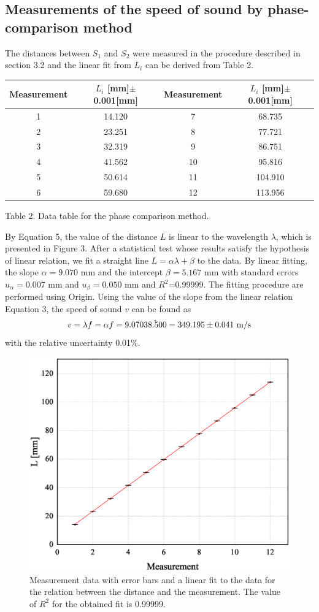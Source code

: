 \documentclass[a4paper]{report}
\begin{document}
	\subsection{Measurements of the speed of sound by phase-comparison method}
	The distances between $S_1$ and $S_2$ were measured in the procedure described in section 3.2 and the linear fit from $L_i$ can be derived from Table 2.
	\begin{tabular}{|c|c||c|c|}
		\hline
		Measurement&$L_i$ [mm]$\pm$0.001[mm]&Measurement&$L_i$ [mm]$\pm$0.001[mm]\\
		\hline
		1&14.120&7&68.735\\
		\hline
		2&23.251&8&77.721\\
		\hline
		3&32.319&9&86.751\\
		\hline
		4&41.562&10&95.816\\
		\hline
		5&50.614&11&104.910\\
		\hline
		6&59.680&12&113.956\\
		\hline
	\end{tabular}
	\begin{center}
		Table 2. Data table for the phase comparison method.
	\end{center}
	By Equation 5, the value of the distance $L$ is linear to the wavelength $\lambda$, which is presented in Figure 3. After a statistical test whose results satisfy the hypothesis of linear relation, we fit a straight line $L=\alpha \lambda+\beta$ to the data. By linear fitting, the slope $\alpha=9.070$ mm and the intercept $\beta=5.167$ mm with standard errors $u_\alpha=0.007$ mm and $u_\beta=0.050$ mm and $R^2$=0.99999. The fitting procedure are performed using Origin.
	Using the value of the slope from the linear relation Equation 3, the speed of sound $v$ can be found as
	\begin{equation}
	v=\lambda f=\alpha f=9.070\dot{38.500}=349.195\pm0.041\  \rm{m/s}
	\end{equation}
	with the relative uncertainty 0.01\%.
	\begin{figure}[H]
		\centering
		\includegraphics[width=0.8\linewidth]{3.eps}
		\caption{Measurement data with error bars and a linear fit to the data for the relation between the distance and the measurement. The value of $R^2$ for the obtained fit is 0.99999.}
		\label{fig:3}
	\end{figure}
\end{document}
